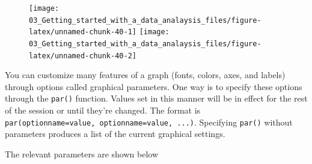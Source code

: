 \documentclass[
]{book}
\newenvironment{Shaded}{\begin{snugshade}}{\end{snugshade}}
\newcommand{\AttributeTok}[1]{\textcolor[rgb]{0.77,0.63,0.00}{#1}}
\newcommand{\DecValTok}[1]{\textcolor[rgb]{0.00,0.00,0.81}{#1}}
\newcommand{\FloatTok}[1]{\textcolor[rgb]{0.00,0.00,0.81}{#1}}
\newcommand{\FunctionTok}[1]{\textcolor[rgb]{0.00,0.00,0.00}{#1}}
\newcommand{\NormalTok}[1]{#1}
\newcommand{\OtherTok}[1]{\textcolor[rgb]{0.56,0.35,0.01}{#1}}
\newcommand{\SpecialCharTok}[1]{\textcolor[rgb]{0.00,0.00,0.00}{#1}}
\newcommand{\StringTok}[1]{\textcolor[rgb]{0.31,0.60,0.02}{#1}}
\begin{document}
\begin{Shaded}
\end{Shaded}

\begin{figure}
\texttt{[image: 03\_Getting\_started\_with\_a\_data\_analaysis\_files/figure-latex/unnamed-chunk-40-1]} \texttt{[image: 03\_Getting\_started\_with\_a\_data\_analaysis\_files/figure-latex/unnamed-chunk-40-2]} \end{figure}

You can customize many features of a graph (fonts, colors, axes, and labels) through options called graphical parameters. One way is to specify these options through the \texttt{par()} function. Values set in this manner will be in effect for the rest of the session or until they're changed. The format is \texttt{par(optionname=value,\ optionname=value,\ ...)}. Specifying \texttt{par()} without parameters produces a list of the current graphical settings.

The relevant parameters are shown below
\end{document}
